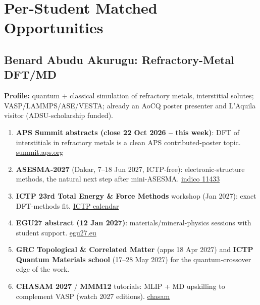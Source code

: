 \documentclass[11pt,a4paper]{article}
\begin{document}
\section{Per-Student Matched Opportunities}

\subsection{Benard Abudu Akurugu: Refractory-Metal DFT/MD}
\textbf{Profile:} quantum + classical simulation of refractory metals, interstitial solutes; VASP/LAMMPS/ASE/VESTA; already an AoC\textbar Q poster presenter and L'Aquila visitor (ADSU-scholarship funded).
\begin{enumerate}[leftmargin=1.6em]
  \item \textbf{APS Summit abstracts (close 22 Oct 2026 -- this week)}: DFT of interstitials in refractory metals is a clean APS contributed-poster topic. \href{https://summit.aps.org/attend/abstracts/}{summit.aps.org}
  \item \textbf{ASESMA-2027} (Dakar, 7--18 Jun 2027, ICTP-free): electronic-structure methods, the natural next step after mini-ASESMA. \href{https://indico.ictp.it/event/11433}{indico 11433}
  \item \textbf{ICTP 23rd Total Energy \& Force Methods} workshop (Jan 2027): exact DFT-methods fit. \href{https://www.ictp.it/home/scientific-calendar}{ICTP calendar}
  \item \textbf{EGU27 abstract (12 Jan 2027)}: materials/mineral-physics sessions with student support. \href{https://www.egu27.eu/}{egu27.eu}
  \item \textbf{GRC Topological \& Correlated Matter} (apps 18 Apr 2027) and \textbf{ICTP Quantum Materials school} (17--28 May 2027) for the quantum-crossover edge of the work.
  \item \textbf{CHASAM 2027} / \textbf{MMM12} tutorials: MLIP + MD upskilling to complement VASP (watch 2027 editions). \href{https://chasam.materialsmodeling.org/}{chasam}
\end{enumerate}
\end{document}
